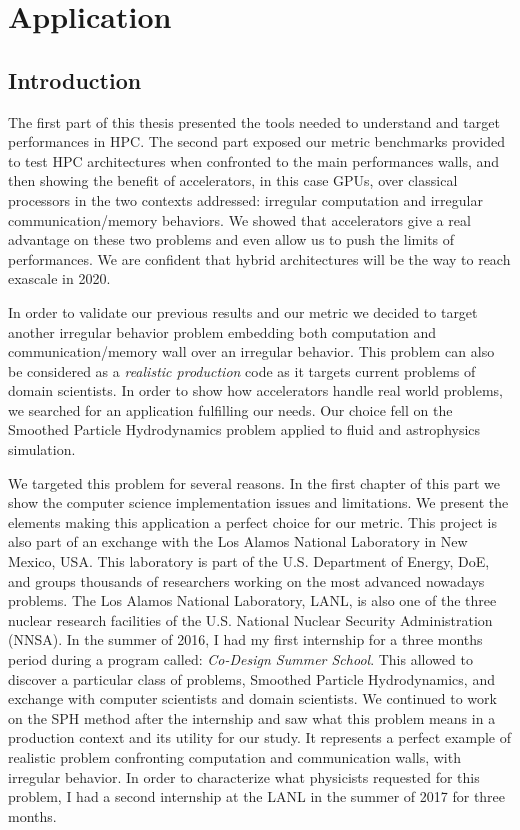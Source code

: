 \part{Application}

\chapter*{Introduction}
The first part of this thesis presented the tools needed to understand and target performances in HPC. 
The second part exposed our metric benchmarks provided to test HPC architectures when confronted to the main performances walls, and then showing the benefit of accelerators, in this case GPUs, over classical processors in the two contexts addressed: irregular computation and irregular communication/memory behaviors.
We showed that accelerators give a real advantage on these two problems and even allow us to push the limits of performances.
We are confident that hybrid architectures will be the way to reach exascale in 2020.

In order to validate our previous results and our metric we decided to target another irregular behavior problem embedding both computation and communication/memory wall over an irregular behavior. 
This problem can also be considered as a \textit{realistic production} code as it targets current problems of domain scientists. 
In order to show how accelerators handle real world problems, we searched for an application fulfilling our needs. 
Our choice fell on the Smoothed Particle Hydrodynamics problem applied to fluid and astrophysics simulation. 

We targeted this problem for several reasons. 
In the first chapter of this part we show the computer science implementation issues and limitations.
We present the elements making this application a perfect choice for our metric.
This project is also part of an exchange with the Los Alamos National Laboratory in New Mexico, USA. 
This laboratory is part of the U.S. Department of Energy, DoE, and groups thousands of researchers working on the most advanced nowadays problems.
The Los Alamos National Laboratory, LANL, is also one of the three nuclear research facilities of the U.S. National Nuclear Security Administration (NNSA). 
In the summer of 2016, I had my first internship for a three months period during a program called: \textit{Co-Design Summer School}.
This allowed to discover a particular class of problems, Smoothed Particle Hydrodynamics, and exchange with computer scientists and domain scientists.
We continued to work on the SPH method after the internship and saw what this problem means in a production context and its utility for our study. 
It represents a perfect example of realistic problem confronting computation and communication walls, with irregular behavior. 
In order to characterize what physicists requested for this problem, I had a second internship at the LANL in the summer of 2017 for three months. 

